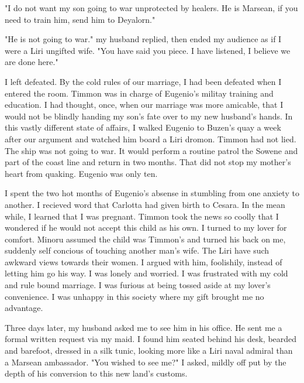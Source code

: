 \documentclass{article}
\begin{document}
"I do not want my son going to war unprotected by healers. He is Marsean, if you need to train him, send him to Deyalorn."

"He is not going to war." my husband replied, then ended my audience as if I were a Liri ungifted wife. "You have said you piece. I have listened, I believe we are done here."



I left defeated. By the cold rules of our marriage, I had been defeated when I entered the room. Timmon was in charge of Eugenio's militay training and education. I had thought, once, when our marriage was more amicable, that I would not be blindly handing my son's fate over to my new husband's hands.  In this vastly different state of affairs, I walked Eugenio to Buzen's quay a week after our argument and watched him board a Liri dromon. Timmon had not lied. The ship was not going to war. It would perform a routine patrol the Sowene and part of the coast line and return in two months. That did not stop my mother's heart from quaking. Eugenio was only ten.

I spent the two hot months of Eugenio's absense in stumbling from one anxiety to another. I recieved word that Carlotta had given birth to Cesara. In the mean while, I learned that I was pregnant. Timmon took the news so coolly that I wondered if he would not accept this child as his own. I turned to my lover for comfort. Minoru assumed the child was Timmon's and turned his back on me, suddenly self concious of touching another man's wife. The Liri have such awkward views towards their women. I argued with him, foolishily, instead of letting him go his way. I was lonely and worried. I was frustrated with my cold and rule bound marriage. I was furious at being tossed aside at my lover's convenience. I was unhappy in this society where my gift brought me no advantage.

Three days later, my husband asked me to see him in his office. He sent me a formal written request via my maid. I found him seated behind his desk, bearded and barefoot, dressed in a silk tunic, looking more like a Liri naval admiral than a Marsean ambassador. "You wished to see me?" I asked, mildly off put by the depth of his conversion to this new land's customs.
\end{document}
